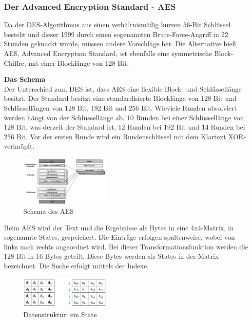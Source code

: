 \documentclass[11pt]{scrartcl}
\begin{document}
\subsubsection{Der Advanced Encryption Standard - AES}
\label{sec:advanced-encryotion-standard}
Da der DES-Algorithmus aus einen verhältnismäßig kurzen 56-Bit Schlüssel besteht und dieser 1999 durch einen sogenannten Brute-Force-Angriff in 22 Stunden geknackt wurde, müssen andere Vorschläge her. Die Alternative hieß AES, Advanced Encryption Standard, ist ebenfalls eine symmetrische Block-Chiffre, mit einer Blocklänge von 128 Bit.
\cite{3}

\noindent \textbf{Das Schema}\\
Der Unterschied zum DES ist, dass AES eine flexible Block- und Schlüssellänge besitzt. Der Standard besitzt eine standardisierte Blocklänge von 128 Bit und Schlüssellängen von 128 Bit, 192 Bit und 256 Bit. Wieviele Runden absolviert werden hängt von der Schlüssellänge ab. 10 Runden bei einer Schlüssellänge von 128 Bit, was derzeit der Standard ist, 12 Runden bei 192 Bit und 14 Runden bei 256 Bit. \grqq{}Vor der ersten Runde wird ein Rundenschlüssel mit dem Klartext XOR-verknüpft.\grqq{}\citep{2}
\cite{3}
\begin{figure}[H]
\includegraphics[width=0.40\textwidth]{Bilder/AES/AES_Schema}
	\caption{Schema des AES \citep{2}}
	\label{fig6}
\end{figure}
\noindent 
Beim AES wird der Text und die Ergebnisse als Bytes in eine 4x4-Matrix, in sogenannte States, gespeichert. Die Einträge erfolgen spaltenweise, wobei von links nach rechts angeordnet wird. Bei dieser Transformationsfunktion werden die 128 Bit in 16 Bytes geteilt. Diese Bytes werden als States in der Matrix bezeichnet. Die Suche erfolgt mittels der Indexe.
\cite{2}\cite{3}
\begin{figure}[H]
\includegraphics[width=0.40\textwidth]{Bilder/AES/AES_State}
	\caption{Datenstruktur: ein State \citep{3}}
	\label{fig7}
\end{figure}
\end{document}

